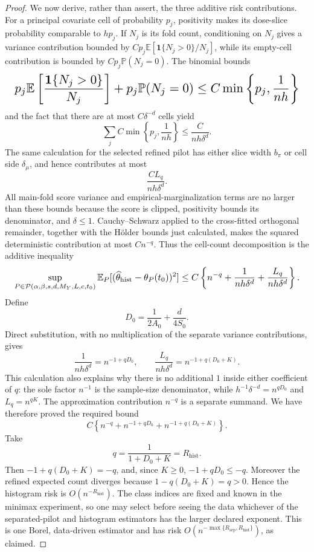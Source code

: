 \documentclass{article}
\begin{document}
\begin{proof}
We now derive, rather than assert, the three additive risk contributions. For a principal covariate cell of probability \(p_j\), positivity makes its dose-slice probability comparable to \(hp_j\). If \(N_j\) is its fold count, conditioning on \(N_j\) gives a variance contribution bounded by \(Cp_j\mathbb E[\mathbf 1\{N_j>0\}/N_j]\), while its empty-cell contribution is bounded by \(Cp_j\mathbb P(N_j=0)\). The binomial bounds
\[
\makebox[\linewidth][c]{\resizebox{0.98\linewidth}{!}{\(\displaystyle p_j\mathbb E\left[\frac{\mathbf 1\{N_j>0\}}{N_j}\right]
+p_j\mathbb P(N_j=0)
\le C\min\left\{p_j,\frac1{nh}\right\}\)}}
\]
and the fact that there are at most \(C\delta^{-d}\) cells yield
\[
\sum_j C\min\left\{p_j,\frac1{nh}\right\}
\le \frac{C}{nh\delta^d}.
\]
The same calculation for the selected refined pilot has either slice width \(b_\pi\) or cell side \(\delta_\mu\), and hence contributes at most
\[
\frac{CL_q}{nh\delta^d}.
\]
All main-fold score variance and empirical-marginalization terms are no larger than these bounds because the score is clipped, positivity bounds its denominator, and \(\delta\le1\). Cauchy--Schwarz applied to the cross-fitted orthogonal remainder, together with the H\"older bounds just calculated, makes the squared deterministic contribution at most \(Cn^{-q}\). Thus the cell-count decomposition is the additive inequality
\[
\makebox[\linewidth][c]{\resizebox{0.98\linewidth}{!}{\(\displaystyle \sup_{P\in\mathcal P(\alpha,\beta,s,d,M_Y,L,c,t_0)}
\mathbb E_P[(\widehat\theta_{\mathrm{hist}}-\theta_P(t_0))^2]
\le C\left\{n^{-q}+\frac1{nh\delta^d}+\frac{L_q}{nh\delta^d}\right\}.\)}}
\]
Define
\[
D_0=\frac1{2A_0}+\frac d{4S_0}.
\]
Direct substitution, with no multiplication of the separate variance contributions, gives
\[
\frac1{nh\delta^d}=n^{-1+qD_0},
\qquad
\frac{L_q}{nh\delta^d}=n^{-1+q(D_0+K)}.
\]
This calculation also explains why there is no additional \(1\) inside either coefficient of \(q\): the sole factor \(n^{-1}\) is the sample-size denominator, while \(h^{-1}\delta^{-d}=n^{qD_0}\) and \(L_q=n^{qK}\). The approximation contribution \(n^{-q}\) is a separate summand. We have therefore proved the required bound
\[
C\left\{n^{-q}+n^{-1+qD_0}+n^{-1+q(D_0+K)}\right\}.
\]
Take
\[
q=\frac1{1+D_0+K}=R_{\mathrm{hist}}.
\]
Then \(-1+q(D_0+K)=-q\), and, since \(K\ge0\), \(-1+qD_0\le-q\). Moreover the refined expected count diverges because \(1-q(D_0+K)=q>0\). Hence the histogram risk is \(O(n^{-R_{\mathrm{hist}}})\). The class indices are fixed and known in the minimax experiment, so one may select before seeing the data whichever of the separated-pilot and histogram estimators has the larger declared exponent. This is one Borel, data-driven estimator and has risk \(O(n^{-\max\{R_{\mathrm{sep}},R_{\mathrm{hist}}\}})\), as claimed.
\end{proof}
\end{document}
